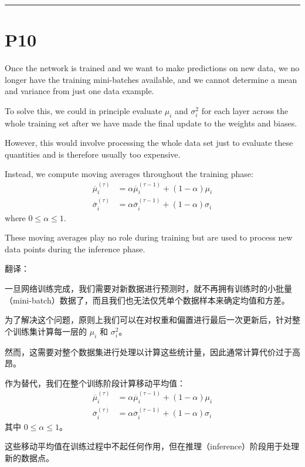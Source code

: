 \documentclass{article}
\begin{document}
\noindent\rule{\linewidth}{0.4pt}

\section{P10}

Once the network is trained and we want to make predictions on new data, we no longer have the training mini-batches available, and we cannot determine a mean and variance from just one data example. 

To solve this, we could in principle evaluate $\mu_i$ and $\sigma_i^2$ for each layer across the whole training set after we have made the final update to the weights and biases. 

However, this would involve processing the whole data set just to evaluate these quantities and is therefore usually too expensive. 

Instead, we compute moving averages throughout the training phase:
\begin{align}
    \overline{\mu}_i^{(\tau)} &= \alpha \overline{\mu}_i^{(\tau-1)} + (1-\alpha) \mu_i \tag{7.56} \\
    \overline{\sigma}_i^{(\tau)} &= \alpha \overline{\sigma}_i^{(\tau-1)} + (1-\alpha) \sigma_i \tag{7.57}
\end{align}
where $0 \leq \alpha \leq 1$. 

These moving averages play no role during training but are used to process new data points during the inference phase.

{\color{red}
翻译：

一旦网络训练完成，我们需要对新数据进行预测时，就不再拥有训练时的小批量（mini-batch）数据了，而且我们也无法仅凭单个数据样本来确定均值和方差。

为了解决这个问题，原则上我们可以在对权重和偏置进行最后一次更新后，针对整个训练集计算每一层的 $\mu_i$ 和 $\sigma_i^2$。

然而，这需要对整个数据集进行处理以计算这些统计量，因此通常计算代价过于高昂。

作为替代，我们在整个训练阶段计算移动平均值：
\begin{align}
    \overline{\mu}_i^{(\tau)} &= \alpha \overline{\mu}_i^{(\tau-1)} + (1-\alpha) \mu_i \tag{7.56} \\
    \overline{\sigma}_i^{(\tau)} &= \alpha \overline{\sigma}_i^{(\tau-1)} + (1-\alpha) \sigma_i \tag{7.57}
\end{align}
其中 $0 \leq \alpha \leq 1$。

这些移动平均值在训练过程中不起任何作用，但在推理（inference）阶段用于处理新的数据点。

}
\end{document}
